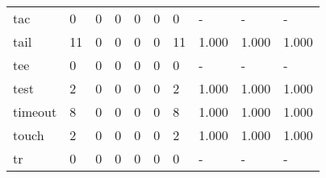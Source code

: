 \begin{longtable}{lp{2.0cm}p{2.0cm}p{2.0cm}p{2.0cm}p{2.0cm}p{2.0cm}p{2.0cm}p{2.0cm}p{2.0cm}}
tac       &                      0 &                                             0 &                                            0 &                                           0 &                                            0 &                                          0 &                                    - &                                      - &                                    - \\
tail      &                     11 &                                             0 &                                            0 &                                           0 &                                            0 &                                         11 &                                1.000 &                                  1.000 &                                1.000 \\
tee       &                      0 &                                             0 &                                            0 &                                           0 &                                            0 &                                          0 &                                    - &                                      - &                                    - \\
test      &                      2 &                                             0 &                                            0 &                                           0 &                                            0 &                                          2 &                                1.000 &                                  1.000 &                                1.000 \\
timeout   &                      8 &                                             0 &                                            0 &                                           0 &                                            0 &                                          8 &                                1.000 &                                  1.000 &                                1.000 \\
touch     &                      2 &                                             0 &                                            0 &                                           0 &                                            0 &                                          2 &                                1.000 &                                  1.000 &                                1.000 \\
tr        &                      0 &                                             0 &                                            0 &                                           0 &                                            0 &                                          0 &                                    - &                                      - &                                    - \\

\end{longtable}
